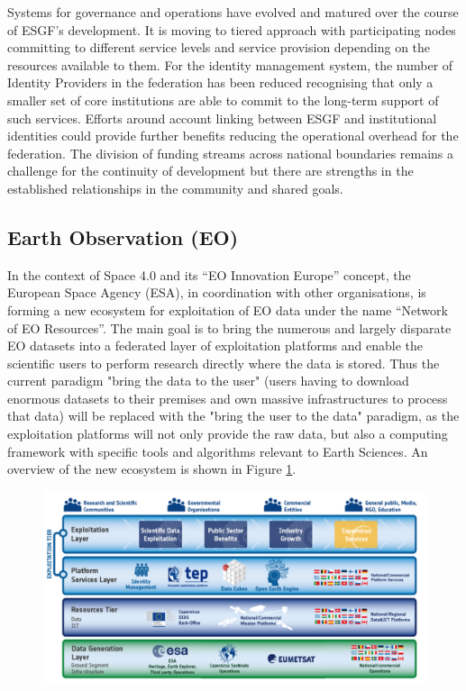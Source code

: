 \documentclass[fleqn,11pt]{wlscirep}
\begin{document}
{Systems for governance and operations have evolved and matured over the course of ESGF's development. It is moving to tiered approach with participating nodes committing to different service levels and service provision depending on the resources available to them. For the identity management system, the number of Identity Providers in the federation has been reduced recognising that only a smaller set of core institutions are able to commit to the long-term support of such services. Efforts around account linking between ESGF and institutional identities could provide further benefits reducing the operational overhead for the federation. The division of funding streams across national boundaries remains a challenge for the continuity of development but there are strengths in the established relationships in the community and shared goals.

\subsection{Earth Observation (EO)}

In the context of Space 4.0 and its “EO Innovation Europe” concept, the European Space Agency (ESA), in coordination with other organisations, is forming a new ecosystem for exploitation of EO data under the name “Network of EO Resources”. The main goal is to bring the numerous and largely disparate EO datasets into a federated layer of exploitation platforms and enable the scientific users to perform research directly where the data is stored. Thus the current paradigm "bring the data to the user" (users having to download enormous datasets to their premises and own massive infrastructures to process that data) will be replaced with the "bring the user to the data" paradigm, as the exploitation platforms will not only provide the raw data, but also a computing framework with specific tools and algorithms relevant to Earth Sciences. An overview of the new ecosystem is shown in Figure \ref{fig:eo}.

\begin{figure}[ht!]
\centering
\includegraphics[width=0.7\columnwidth]{eo.png}
\caption{}
\label{fig:eo}
\end{figure}

}
\end{document}
